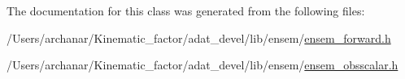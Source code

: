 The documentation for this class was generated from the following files\+:\begin{DoxyCompactItemize}
\item 
/\+Users/archanar/\+Kinematic\+\_\+factor/adat\+\_\+devel/lib/ensem/\mbox{\hyperlink{lib_2ensem_2ensem__forward_8h}{ensem\+\_\+forward.\+h}}\item 
/\+Users/archanar/\+Kinematic\+\_\+factor/adat\+\_\+devel/lib/ensem/\mbox{\hyperlink{lib_2ensem_2ensem__obsscalar_8h}{ensem\+\_\+obsscalar.\+h}}\end{DoxyCompactItemize}
